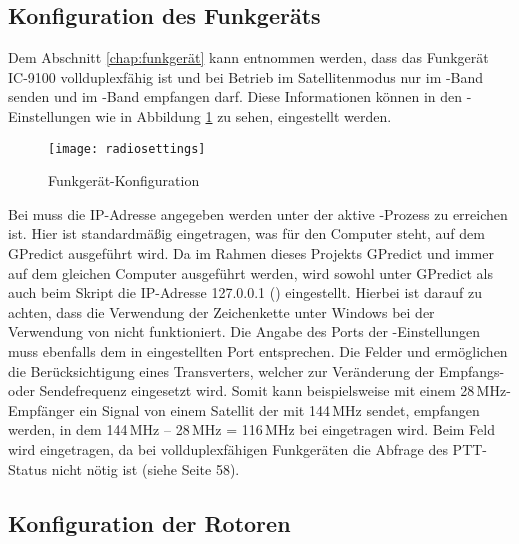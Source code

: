 \clearpage

\subsection{Konfiguration des Funkgeräts}
\label{chap:radioconfig}

Dem Abschnitt \ref{chap:funkgerät} kann entnommen werden, dass das Funkgerät IC-9100 vollduplexfähig ist und bei Betrieb im Satellitenmodus nur im -Band senden und im -Band empfangen darf. Diese Informationen können in den -Einstellungen wie in Abbildung \ref{fig:radioconfig} zu sehen, eingestellt werden. 

\begin{figure}[h]
	\centering
	\texttt{[image: radiosettings]}
	\caption{Funkgerät-Konfiguration}
	\label{fig:radioconfig} 
\end{figure}

Bei  muss die IP-Adresse angegeben werden unter der aktive -Prozess zu erreichen ist. Hier ist standardmäßig  eingetragen, was für den Computer steht, auf dem GPredict ausgeführt wird. Da im Rahmen dieses Projekts GPredict und  immer auf dem gleichen Computer ausgeführt werden, wird sowohl unter GPredict als auch beim Skript  die IP-Adresse 127.0.0.1 () eingestellt. Hierbei ist darauf zu achten, dass die Verwendung der Zeichenkette  unter Windows bei der Verwendung von  nicht funktioniert. Die Angabe des Ports der -Einstellungen muss ebenfalls dem in  eingestellten Port entsprechen. Die Felder  und  ermöglichen die Berücksichtigung eines Transverters, welcher zur Veränderung der Empfangs- oder Sendefrequenz eingesetzt wird. Somit kann beispielsweise mit einem 28\,MHz-Empfänger ein Signal von einem Satellit der mit 144\,MHz sendet, empfangen werden, in dem 144\,MHz -- 28\,MHz = 116\,MHz bei  eingetragen wird. Beim Feld  wird  eingetragen, da bei vollduplexfähigen Funkgeräten die Abfrage des \ac{PTT}-Status nicht nötig ist (siehe \cite{gpredictmanual} Seite 58).

\clearpage

\subsection{Konfiguration der Rotoren}
\label{chap:rotatorconfig}	

